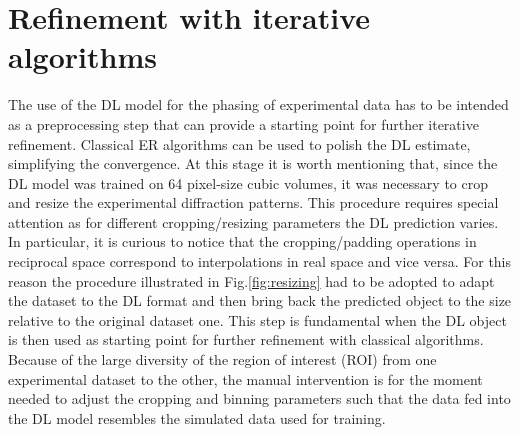 \section{Refinement with iterative algorithms}\label{chp:refinement}

The use of the DL model for the phasing of experimental data has to be intended as a preprocessing step that can provide 
a starting point for further iterative refinement. Classical ER algorithms can be used to polish the DL estimate, simplifying 
the convergence.
At this stage it is worth mentioning that, since the DL model was trained on 64 pixel-size cubic volumes, it was necessary 
to crop and resize the experimental diffraction patterns. This procedure requires special attention as for different 
cropping/resizing parameters the DL prediction varies. In particular, it is curious to notice that the cropping/padding 
operations in reciprocal space correspond to interpolations in real space and vice versa. For this reason the procedure 
illustrated in Fig.\ref{fig:resizing} had to be adopted to adapt the dataset to the DL format and then bring back 
the predicted object to the size relative to the original dataset one. This step is fundamental when the DL object is then 
used as starting point for further refinement with classical algorithms.  
Because of the large diversity of the region of interest (ROI) from one experimental dataset to the other, the manual 
intervention is for the moment needed to adjust the cropping and binning parameters such that the data fed into the DL 
model resembles the simulated data used for training. 

